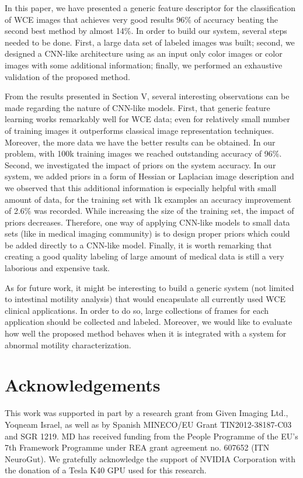 \documentclass[review,12pt,3p]{elsarticle}
\begin{document}
In this paper, we have presented a generic feature descriptor for the classification of WCE images that achieves very good results 96\% of accuracy beating the second best method by almost 14\%. In order to build our system, several steps needed to be done. First, a large data set of labeled images was built; second, we designed a CNN-like architecture using as an input only color images or color images with some additional information; finally, we performed an exhaustive validation of the proposed method.

From the results presented in Section V, several interesting observations can be made regarding the nature of CNN-like models. First, that generic feature learning works remarkably well for WCE data; even for relatively small number of training images it outperforms classical image representation techniques. Moreover, the more data we have the better results can be obtained. In our problem, with 100k training images we reached outstanding accuracy of 96\%. Second, we investigated the impact of priors on the system accuracy. In our system, we added priors in a form of Hessian or Laplacian image description and we observed that this additional information is especially helpful with small amount of data, for the training set with 1k examples an accuracy improvement of 2.6\% was recorded. While increasing the size of the training set, the impact of priors decreases. Therefore, one way of applying CNN-like models to small data sets (like in medical imaging community) is to design proper priors which could be added directly to a CNN-like model. Finally, it is worth remarking that creating a good quality labeling of large amount of medical data is still a very laborious and expensive task.

As for future work, it might be interesting to build a generic system (not limited to intestinal motility analysis) that would encapsulate all currently used WCE clinical applications. In order to do so, large collections of frames for each application should be collected and labeled. Moreover, we would like to evaluate how well the proposed method behaves when it is integrated with a system for abnormal motility characterization.



\section*{Acknowledgements}
This work was supported in part by a research grant from
Given Imaging Ltd., Yoqneam Israel, as well as by Spanish
MINECO/EU Grant TIN2012-38187-C03 and SGR 1219. MD has received funding from the People Programme of the EU’s 7th Framework Programme under REA grant agreement no. 607652 (ITN NeuroGut). We gratefully acknowledge the support of NVIDIA Corporation with the donation of a Tesla K40 GPU used for this research.





\end{document}
